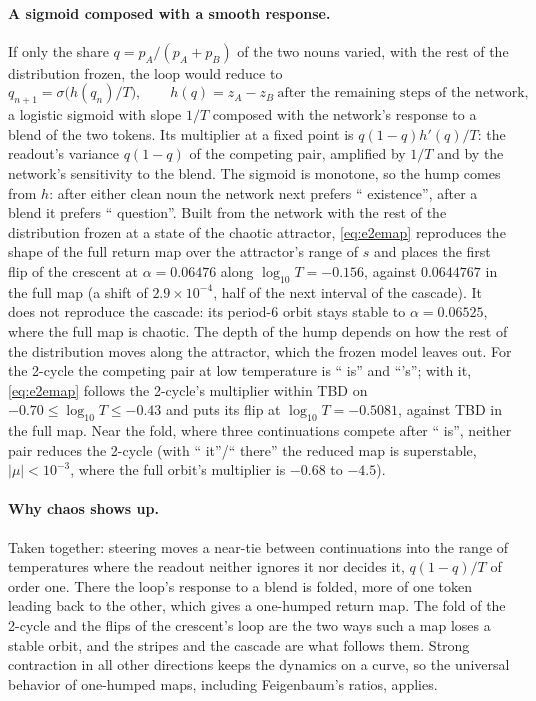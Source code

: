 \paragraph{A sigmoid composed with a smooth response.} If only the share $q=p_A/(p_A+p_B)$ of the two nouns varied,
with the rest of the distribution frozen, the loop would reduce to
\begin{equation}
  q_{n+1}=\sigma\!\big(h(q_n)/T\big),\qquad h(q)=z_A-z_B\ \text{after the remaining steps of the network},
  \label{eq:e2emap}
\end{equation}
a logistic sigmoid with slope $1/T$ composed with the network's response to a blend of the two tokens. Its multiplier
at a fixed point is $q(1-q)h'(q)/T$: the readout's variance $q(1-q)$ of the competing pair, amplified by $1/T$ and by
the network's sensitivity to the blend. The sigmoid is monotone, so the hump comes from $h$: after either clean noun
the network next prefers `` existence'', after a blend it prefers `` question''. Built from the network with the rest
of the distribution frozen at a state of the chaotic attractor, \eqref{eq:e2emap} reproduces the shape of the full
return map over the attractor's range of $s$ and places the first flip of the crescent at $\alpha=0.06476$ along
$\log_{10}T=-0.156$, against $0.0644767$ in the full map (a shift of $2.9\times10^{-4}$, half of the next interval
of the cascade). It does not reproduce the cascade: its period-6 orbit stays stable to $\alpha=0.06525$, where the
full map is chaotic. The depth of the hump depends on how the rest of the distribution moves along the attractor,
which the frozen model leaves out. For the 2-cycle the competing pair at low temperature is `` is'' and ``'s'';
with it, \eqref{eq:e2emap} follows the 2-cycle's multiplier within TBD on $-0.70\le\log_{10}T\le-0.43$ and puts its
flip at $\log_{10}T=-0.5081$, against TBD in the full map. Near the fold, where three continuations compete after
`` is'', neither pair reduces the 2-cycle (with `` it''/`` there'' the reduced map is superstable, $|\mu|<10^{-3}$,
where the full orbit's multiplier is $-0.68$ to $-4.5$).

\paragraph{Why chaos shows up.} Taken together: steering moves a near-tie between continuations into the range of
temperatures where the readout neither ignores it nor decides it, $q(1-q)/T$ of order one. There the loop's response
to a blend is folded, more of one token leading back to the other, which gives a one-humped return map. The fold of
the 2-cycle and the flips of the crescent's loop are the two ways such a map loses a stable orbit, and the stripes
and the cascade are what follows them. Strong contraction in all other directions keeps the dynamics on a curve, so
the universal behavior of one-humped maps, including Feigenbaum's ratios, applies.

